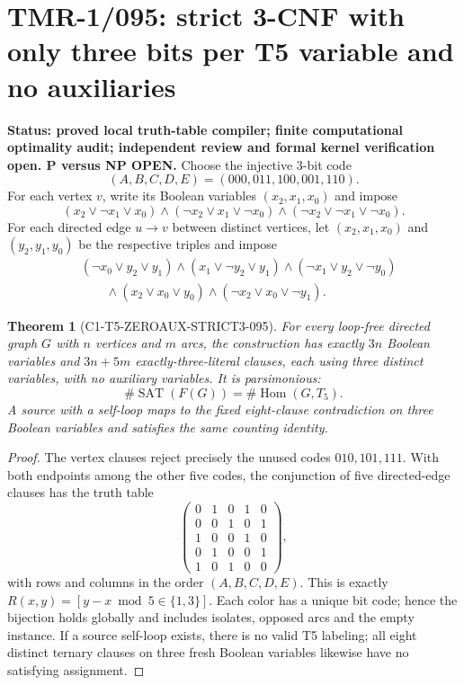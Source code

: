 \documentclass[11pt]{article}
\newtheorem{theorem}{Theorem}
\begin{document}
\section{TMR-1/095: strict 3-CNF with only three bits per T5 variable and no auxiliaries}
\noindent\textbf{Status: proved local truth-table compiler; finite computational
optimality audit; independent review and formal kernel verification open. P versus NP OPEN.}
Choose the injective 3-bit code
\[
 (A,B,C,D,E)=(000,011,100,001,110).
\]
For each vertex $v$, write its Boolean variables $(x_2,x_1,x_0)$ and impose
\[
 (x_2\vee\neg x_1\vee x_0)
 \wedge(\neg x_2\vee x_1\vee\neg x_0)
 \wedge(\neg x_2\vee\neg x_1\vee\neg x_0).
\]
For each directed edge $u\to v$ between distinct vertices, let
$(x_2,x_1,x_0)$ and $(y_2,y_1,y_0)$ be the respective triples and impose
\begin{align*}
 &(\neg x_0\vee y_2\vee y_1)
 \wedge(x_1\vee\neg y_2\vee y_1)
 \wedge(\neg x_1\vee y_2\vee\neg y_0)\\
 &\qquad{}\wedge(x_2\vee x_0\vee y_0)
 \wedge(\neg x_2\vee x_0\vee\neg y_1).
\end{align*}
\begin{theorem}[C1-T5-ZEROAUX-STRICT3-095]
For every loop-free directed graph $G$ with $n$ vertices and $m$ arcs,
the construction has exactly $3n$ Boolean variables and $3n+5m$
exactly-three-literal clauses, each using three distinct variables,
with no auxiliary variables. It is parsimonious:
\[
  \#\operatorname{SAT}(F(G))=\#\operatorname{Hom}(G,T_5).
\]
A source with a self-loop maps to the fixed eight-clause contradiction
on three Boolean variables and satisfies the same counting identity.
\end{theorem}
\begin{proof}
The vertex clauses reject precisely the unused codes
$010,101,111$. With both endpoints among the other five codes,
the conjunction of five directed-edge clauses has the truth table
\[
\begin{pmatrix}
0&1&0&1&0\\
0&0&1&0&1\\
1&0&0&1&0\\
0&1&0&0&1\\
1&0&1&0&0
\end{pmatrix},
\]
with rows and columns in the order $(A,B,C,D,E)$. This is exactly
$R(x,y)=[y-x\bmod5\in\{1,3\}]$. Each color has a unique bit code;
hence the bijection holds globally and includes isolates,
opposed arcs and the empty instance. If a source self-loop exists,
there is no valid T5 labeling; all eight distinct ternary clauses
on three fresh Boolean variables likewise have no satisfying assignment.
\end{proof}
\end{document}
